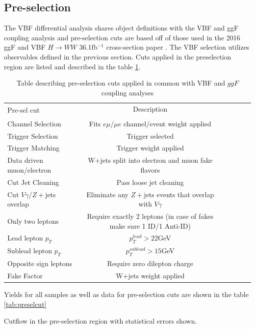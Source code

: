 \subsection{Pre-selection}
The VBF differential analysis shares object definitions with the VBF and ggF coupling analysis and pre-selection cuts are based off of those used in the 2016 ggF and VBF $H\rightarrow WW$ 36.1fb$^{-1}$ cross-section paper \cite{Aaboud_2019}. The VBF selection utilizes observables defined in the previous section. Cuts applied in the preselection region are listed and described in the table \ref{tab:preseldef}. 
\begin{table}[h!]
\centering
\small{
\begin{tabular}{|l|c|c|c|c|c|}
\hline
\multirow{2}{*}{Pre-sel cut}   & Description \\
				&	 \\
\hline
Channel Selection	& Fits $e\mu$/$\mu e$ channel/event weight applied\\  
Trigger Selection	&  Trigger selected \\
Trigger Matching	&  Trigger weight applied  \\
Data driven muon/electron & W+jets split into electron and muon fake flavors \\
Cut Jet Cleaning	& Pass loose jet cleaning \\
Cut $V\gamma$/$Z+$jets overlap & Eliminate any $Z+$jets events that overlap with $V\gamma$ \\ 
Only two leptons       	&  Require exactly 2 leptons (in case of fakes make sure 1 ID/1 Anti-ID) \\
Lead lepton $p_T$	& $p_T^{lead} > 22 $GeV \\
Sublead lepton $p_T$	& $p_T^{sublead} >15 $GeV \\
Opposite sign leptons	&  Require zero dilepton charge \\
Fake Factor	& W+jets weight applied \\
\hline
\end{tabular}
\caption{Table describing pre-selection cuts applied in common with VBF and $ggF$ coupling analyses}
\label{tab:preseldef}
}
\end{table}

Yields for all samples as well as data for pre-selection cuts are shown in the table \ref{tab:preselcut}
\begin{table}[h!]
\scalebox{.45}{

}
\caption{Cutflow in the pre-selection region with statistical errors shown.}
\label{tab:preselcut}
\end{table}

